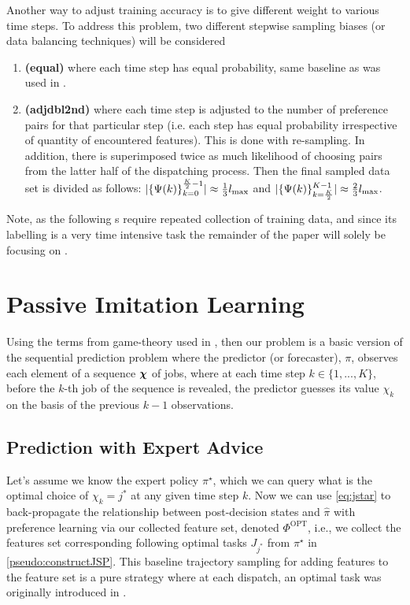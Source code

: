 \documentclass[smallextended]{svjour3}
\begin{document}
	Another way to adjust training accuracy is to give different weight to various 
	time steps. To address this problem, two different stepwise sampling biases (or 
	data balancing techniques) will be considered
	\begin{enumerate}[after={{}}, leftmargin=*,
		label={\textbf{Bias.\arabic*}}, ref={{Bias.\arabic*}}]
		\item \label{bias:equal} \textbf{(equal)} where each time step has equal 
		probability, same baseline as was used in \cite{InRu14,InRu15a}.
		\item \label{bias:adjdbl2nd} \textbf{(adjdbl2nd)} where each time step is 
		adjusted to the number of preference pairs for that particular step (i.e. 
		each step has equal probability irrespective of quantity of encountered 
		features). This is done with re-sampling.
		In addition, there is superimposed twice as much likelihood of 
		choosing pairs from the latter half of the dispatching process. Then the 
		final sampled data set is divided as follows:
		$\lvert\{\Psi(k)\}_{k=0}^{\frac{K}{2}-1}\rvert \approx \frac{1}{3}l_{\max}$ and 
		$\lvert\{\Psi(k)\}_{k=\frac{K}{2}}^{K-1}\rvert \approx \frac{2}{3}l_{\max}$.
	\end{enumerate}
	
	Note, as the following s require repeated collection 
	of training data, and since its labelling is a very time intensive task the 
	remainder of the paper will solely be focusing on .
	
	\section{Passive Imitation Learning}\label{sec:il:passive}
	Using the terms from game-theory used in \cite{CesaBianchi06}, %
	then our problem is a basic version of the sequential prediction problem where 
	the predictor (or forecaster), $\pi$, observes each element of a sequence 
	$\bm \chi$ of jobs, where at each time step $k \in \{1,...,K\}$, before the 
	$k$-th job of the sequence is revealed, the predictor guesses its value 
	$\chi_k$ on the basis of the previous $k-1$ observations. 
	
	\subsection{Prediction with Expert Advice}\label{sec:expertPolicy}
	Let's assume we know the expert policy $\pi^\star$, which we can query what 
	is the optimal choice of $\chi_k={j^*}$ at any given time step $k$. 
	Now we can use \cref{eq:jstar} to back-propagate the relationship between 
	post-decision states and $\hat{\pi}$ with preference learning via our collected 
	feature set, denoted $\Phi^\text{OPT}$, i.e., we collect the features set 
	corresponding following optimal tasks $J_{j^*}$ from $\pi^\star$ in 
	\cref{pseudo:constructJSP}.
	This baseline trajectory sampling for adding features to the feature set 
	is a pure strategy where at each dispatch, an optimal task was originally 
	introduced in \cite{InRu11a}.
	
\end{document}
